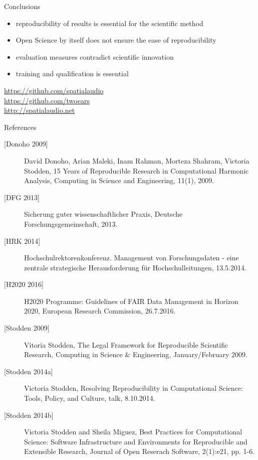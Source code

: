\documentclass{intbeamer}
\begin{document}
\begin{frame}{Conclusions}

\begin{itemize}
\item reproducibility of results is essential for the scientific method
\item Open Science by itself does not ensure the ease of reproducibility
\item evaluation measures contradict scientific innovation
\item training and qualification is essential
\end{itemize}

\vfill

{\large
\url{https://github.com/spatialaudio}\\[1ex]
\url{https://github.com/twoears}\\[1ex]
\url{http://spatialaudio.net}
}

\end{frame}


\begin{frame}{References}

{\scriptsize
\begin{description}
\item[{[Donoho 2009]}] David Donoho, Arian Maleki, Inam Rahman, Morteza Shahram, Victoria Stodden, 15 Years of Reproducible Research in Computational Harmonic Analysis, Computing in Science and Engineering, 11(1), 2009.
\item[{[DFG 2013]}] Sicherung guter wissenschaftlicher Praxis, Deutsche Forschungsgemeinschaft, 2013. 
\item[{[HRK 2014]}] Hochschulrektorenkonferenz. Management von Forschungsdaten - eine zentrale strategische Herausforderung für Hochschulleitungen, 13.5.2014.
\item[{[H2020 2016]}] H2020 Programme: Guidelines of FAIR Data Management in Horizon 2020, European Research Commission, 26.7.2016.
\item[{[Stodden 2009]}] Vitoria Stodden, The Legal Framework for Reproducible Scientific Research, Computing in Science \& Engineering, January/February 2009.
\item[{[Stodden 2014a]}] Victoria Stodden, Resolving Reproducibility in Computational Science: Tools, Policy, and Culture, talk, 8.10.2014.
\item[{[Stodden 2014b]}] Victoria Stodden and Sheila Miguez, Best Practices for Computational Science: Software Infrastructure and Environments for Reproducible and Extensible Research, Journal of Open Reserach Software, 2(1):e21, pp. 1-6.


\end{description}
}

\end{frame}
\end{document}
